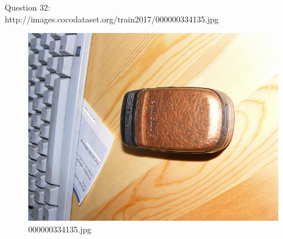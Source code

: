     Question 32:\\http://images.cocodataset.org/train2017/000000334135.jpg
    \begin{figure}[h]
        \centering
        \includegraphics[width=0.8\linewidth]{../image set/easy/000000334135.jpg}
        \caption{000000334135.jpg}
    \end{figure}
